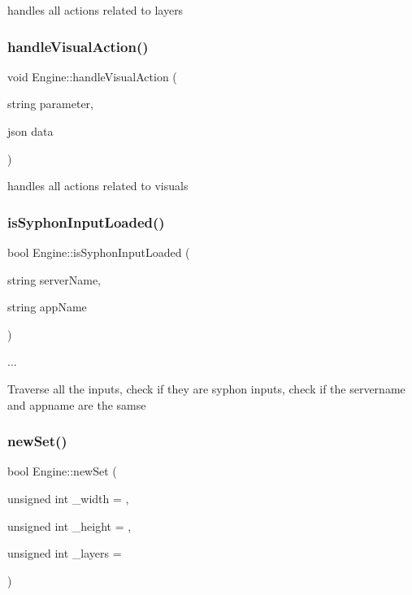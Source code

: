 handles all actions related to layers \mbox{\label{class_engine_a8342ba4b8e00754a5dc78e9590df4fbb}} 
\subsubsection{\texorpdfstring{handle\+Visual\+Action()}{handleVisualAction()}}
{\footnotesize\ttfamily void Engine\+::handle\+Visual\+Action (\begin{DoxyParamCaption}\item[{string}]{parameter,  }\item[{json}]{data }\end{DoxyParamCaption})}

handles all actions related to visuals \mbox{\label{class_engine_a3c973c85ef1912fc5d50c582ddb2d135}} 
\subsubsection{\texorpdfstring{is\+Syphon\+Input\+Loaded()}{isSyphonInputLoaded()}}
{\footnotesize\ttfamily bool Engine\+::is\+Syphon\+Input\+Loaded (\begin{DoxyParamCaption}\item[{string}]{server\+Name,  }\item[{string}]{app\+Name }\end{DoxyParamCaption})}

...

Traverse all the inputs, check if they are syphon inputs, check if the servername and appname are the samse \mbox{\label{class_engine_adc03481dd61714c7bfc3ffe48e2772a9}} 
\subsubsection{\texorpdfstring{new\+Set()}{newSet()}}
{\footnotesize\ttfamily bool Engine\+::new\+Set (\begin{DoxyParamCaption}\item[{unsigned int}]{\+\_\+width = {},  }\item[{unsigned int}]{\+\_\+height = {},  }\item[{unsigned int}]{\+\_\+layers = {} }\end{DoxyParamCaption})}

